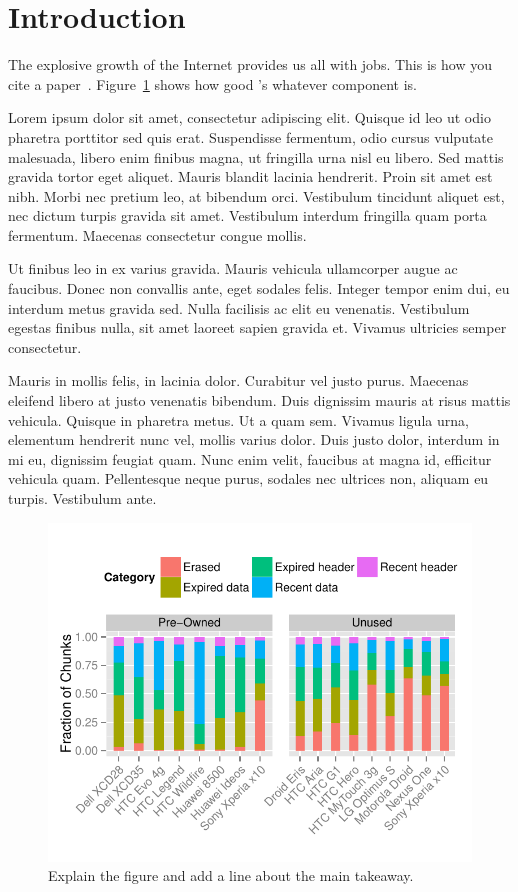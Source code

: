 \section{Introduction}
\label{sec:intro}

The explosive growth of the Internet provides us all with jobs. This is how you
cite a paper~\cite{Walls:2011a}. Figure~\ref{fig:bar} shows how good \sysname's
whatever component is.

Lorem ipsum dolor sit amet, consectetur adipiscing elit. Quisque id leo ut odio
pharetra porttitor sed quis erat. Suspendisse fermentum, odio cursus vulputate
malesuada, libero enim finibus magna, ut fringilla urna nisl eu libero. Sed
mattis gravida tortor eget aliquet. Mauris blandit lacinia hendrerit. Proin sit
amet est nibh. Morbi nec pretium leo, at bibendum orci. Vestibulum tincidunt
aliquet est, nec dictum turpis gravida sit amet. Vestibulum interdum fringilla
quam porta fermentum. Maecenas consectetur congue mollis.

Ut finibus leo in ex varius gravida. Mauris vehicula ullamcorper augue ac
faucibus. Donec non convallis ante, eget sodales felis. Integer tempor enim
dui, eu interdum metus gravida sed. Nulla facilisis ac elit eu venenatis.
Vestibulum egestas finibus nulla, sit amet laoreet sapien gravida et. Vivamus
ultricies semper consectetur.

Mauris in mollis felis, in lacinia dolor. Curabitur vel justo purus. Maecenas
eleifend libero at justo venenatis bibendum. Duis dignissim mauris at risus
mattis vehicula. Quisque in pharetra metus. Ut a quam sem. Vivamus ligula urna,
elementum hendrerit nunc vel, mollis varius dolor. Duis justo dolor, interdum
in mi eu, dignissim feugiat quam. Nunc enim velit, faucibus at magna id,
efficitur vehicula quam. Pellentesque neque purus, sodales nec ultrices non,
aliquam eu turpis. Vestibulum ante.

\begin{figure}[t]
\centering
\includegraphics[width=\columnwidth]{../figures/bar_chunk/bar_chunk_fraction.pdf}
\caption{Explain the figure and add a line about the main takeaway.}
\label{fig:bar}
\end{figure} 

